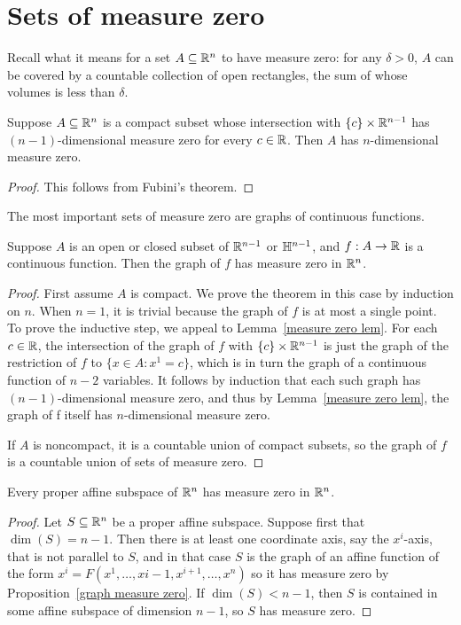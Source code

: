 \section{Sets of measure zero}
Recall what it means for a set $A\subseteq\mathbb{R}^n$ to have measure zero: for any $\delta>0$, $A$ can be covered by a countable collection of open rectangles, the sum of whose volumes is less than $\delta$.
\begin{lemma}\label{measure zero lem}
Suppose $A\subseteq\mathbb{R}^n$ is a compact subset whose intersection with $\{c\}\times\mathbb{R}^{n-1}$ has $(n-1)$-dimensional measure zero for every $c\in\mathbb{R}$. Then $A$ has $n$-dimensional measure zero.
\end{lemma}
\begin{proof}
This follows from Fubini's theorem.
\end{proof}
The most important sets of measure zero are graphs of continuous functions.
\begin{proposition}\label{graph measure zero}
Suppose $A$ is an open or closed subset of $\mathbb{R}^{n-1}$ or $\mathbb{H}^{n-1}$, and $f:A\to\mathbb{R}$ is a continuous function. Then the graph of $f$ has measure zero in $\mathbb{R}^n$.
\end{proposition}
\begin{proof}
First assume $A$ is compact. We prove the theorem in this case by induction on $n$. When $n=1$, it is trivial because the graph of $f$ is at most a single point. To prove the inductive step, we appeal to Lemma~\ref{measure zero lem}. For each $c\in\mathbb{R}$, the intersection of the graph of $f$ with $\{c\}\times\mathbb{R}^{n-1}$ is just the graph of the restriction of $f$ to $\{x\in A:x^1=c\}$, which is in turn the graph of a continuous function of $n-2$ variables. It follows by induction that each such graph has $(n-1)$-dimensional measure zero, and thus by Lemma~\ref{measure zero lem}, the graph of f itself has $n$-dimensional measure zero.\par
If $A$ is noncompact, it is a countable union of compact subsets, so the graph of $f$ is a countable union of sets of measure zero.
\end{proof}
\begin{proposition}
Every proper affine subspace of $\mathbb{R}^n$ has measure zero in $\mathbb{R}^n$.
\end{proposition}
\begin{proof}
Let $S\subseteq\mathbb{R}^n$ be a proper affine subspace. Suppose first that $\dim(S)=n-1$. Then there is at least one coordinate axis, say the $x^i$-axis, that is not parallel to $S$, and in that case $S$ is the graph of an affine function of the form $x^i=F(x^1,\dots,x{i-1},x^{i+1},\dots,x^n)$ so it has measure zero by Proposition~\ref{graph measure zero}. If $\dim(S)<n-1$, then $S$ is contained in some affine subspace of dimension $n-1$, so $S$ has measure zero.
\end{proof}
